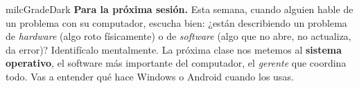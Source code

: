 \documentclass[11pt,letterpaper]{article}
\begin{document}
\begin{infoband}{milcGradeDark}
\textbf{Para la próxima sesión.} Esta semana, cuando alguien hable de un problema con su computador, escucha bien: ¿están describiendo un problema de \emph{hardware} (algo roto físicamente) o de \emph{software} (algo que no abre, no actualiza, da error)? Identifícalo mentalmente. La próxima clase nos metemos al \textbf{sistema operativo}, el software más importante del computador, el \emph{gerente} que coordina todo. Vas a entender qué hace Windows o Android cuando los usas.
\end{infoband}
\end{document}
